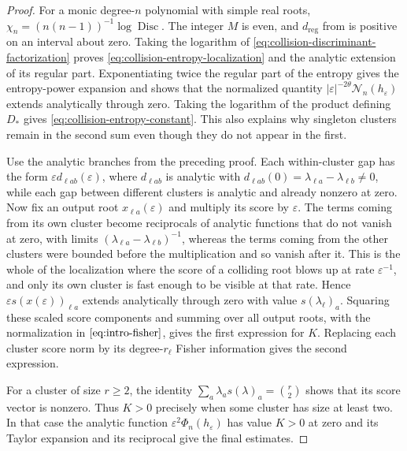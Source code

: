 \documentclass[12pt,reqno]{amsart}
\theoremstyle{definition}
\theoremstyle{remark}
\newcommand{\eps}{\varepsilon}
\begin{document}
\begin{proof}
For a monic degree-\(n\) polynomial with simple real roots,
\(\chi_n=(n(n-1))^{-1}\log\operatorname{Disc}\).  The integer
\(M\) is even, and \(d_{\mathrm{reg}}\) from
 is positive on an interval about
zero.  Taking the logarithm of \eqref{eq:collision-discriminant-factorization} proves \eqref{eq:collision-entropy-localization} and the analytic extension of its regular part. Exponentiating twice the regular part of the entropy gives the entropy-power expansion and shows that the normalized quantity \(|\varepsilon|^{-2\theta}\mathcal N_n(h_\varepsilon)\) extends analytically through zero. Taking the logarithm of the product defining \(D_*\) gives \eqref{eq:collision-entropy-constant}. This also explains why singleton clusters remain in the second sum even though they do not appear in the first.

Use the analytic branches from the preceding proof.  Each within-cluster
gap has the form \(\eps d_{\ell ab}(\eps)\), where \(d_{\ell ab}\) is
analytic with \(d_{\ell ab}(0)=\lambda_{\ell a}-\lambda_{\ell b}\ne0\),
while each gap between different clusters is analytic and already nonzero
at zero.  Now fix an output root \(x_{\ell a}(\eps)\) and multiply its
score by \(\eps\).  The terms coming from its own cluster become
reciprocals of analytic functions that do not vanish at zero, with limits
\((\lambda_{\ell a}-\lambda_{\ell b})^{-1}\), whereas the terms coming from the other clusters were bounded before the multiplication and so vanish after it. This is the whole of the localization where the score of a colliding root blows up at rate \(\eps^{-1}\), and only its own cluster is fast enough to be visible at that rate.  Hence \(\eps s(x(\eps))_{\ell a}\) extends analytically through zero with value \(s(\lambda_\ell)_a\).
Squaring these scaled score components and summing over all output roots, with the normalization in \(\eqref{eq:intro-fisher}\), gives the first expression for \(K\).  Replacing each cluster score norm by its degree-\(r_\ell\) Fisher information gives the second expression.

For a cluster of size \(r\geq2\), the identity
\(\sum_a\lambda_a s(\lambda)_a=\binom r2\) shows that its
score vector is nonzero.  Thus \(K>0\) precisely when some cluster
has size at least two.  In that case the analytic function \(\eps^2\Phi_n(h_\eps)\) has value \(K>0\) at zero and its Taylor expansion and its reciprocal give the final estimates.
\end{proof}
\end{document}
